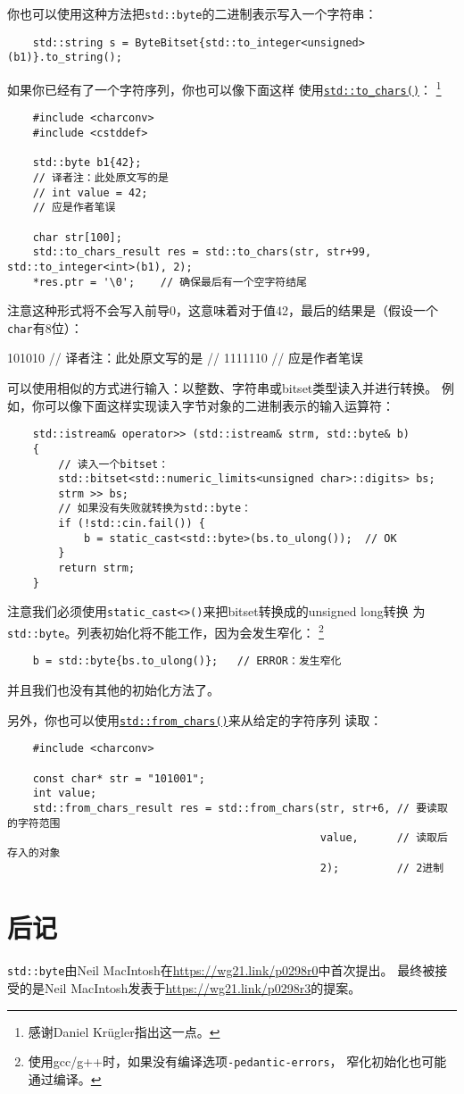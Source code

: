 你也可以使用这种方法把\texttt{std::byte}的二进制表示写入一个字符串：
\begin{lstlisting}
    std::string s = ByteBitset{std::to_integer<unsigned>(b1)}.to_string();
\end{lstlisting}
如果你已经有了一个字符序列，你也可以像下面这样
使用\hyperref[ch31.2.2]{\texttt{std::to\_chars()}}：\label{byte到位序列}
\footnote{感谢Daniel Krügler指出这一点。}
\begin{lstlisting}
    #include <charconv>
    #include <cstddef>

    std::byte b1{42};
    // 译者注：此处原文写的是
    // int value = 42;
    // 应是作者笔误

    char str[100];
    std::to_chars_result res = std::to_chars(str, str+99, std::to_integer<int>(b1), 2);
    *res.ptr = '\0';    // 确保最后有一个空字符结尾
\end{lstlisting}
注意这种形式将不会写入前导0，这意味着对于值42，最后的结果是（假设一个\texttt{char}有8位）：
\begin{blacklisting}
    101010
    // 译者注：此处原文写的是
    // 1111110
    // 应是作者笔误
\end{blacklisting}
可以使用相似的方式进行输入：以整数、字符串或bitset类型读入并进行转换。
例如，你可以像下面这样实现读入字节对象的二进制表示的输入运算符：
\begin{lstlisting}
    std::istream& operator>> (std::istream& strm, std::byte& b)
    {
        // 读入一个bitset：
        std::bitset<std::numeric_limits<unsigned char>::digits> bs;
        strm >> bs;
        // 如果没有失败就转换为std::byte：
        if (!std::cin.fail()) {
            b = static_cast<std::byte>(bs.to_ulong());  // OK
        }
        return strm;
    }
\end{lstlisting}
注意我们必须使用\texttt{static\_cast<>()}来把bitset转换成的unsigned long转换
为\texttt{std::byte}。列表初始化将不能工作，因为会发生窄化：
\footnote{使用gcc/g++时，如果没有编译选项\texttt{-pedantic-errors}，
窄化初始化也可能通过编译。}
\begin{lstlisting}
    b = std::byte{bs.to_ulong()};   // ERROR：发生窄化
\end{lstlisting}
并且我们也没有其他的初始化方法了。

另外，你也可以使用\hyperref[ch31.2.1]{\texttt{std::from\_chars()}}来从给定的字符序列
读取：\label{位序列到byte}
\begin{lstlisting}
    #include <charconv>

    const char* str = "101001";
    int value;
    std::from_chars_result res = std::from_chars(str, str+6, // 要读取的字符范围
                                                 value,      // 读取后存入的对象
                                                 2);         // 2进制
\end{lstlisting}


\section{后记}
\texttt{std::byte}由Neil MacIntosh在\url{https://wg21.link/p0298r0}中首次提出。
最终被接受的是Neil MacIntosh发表于\url{https://wg21.link/p0298r3}的提案。
